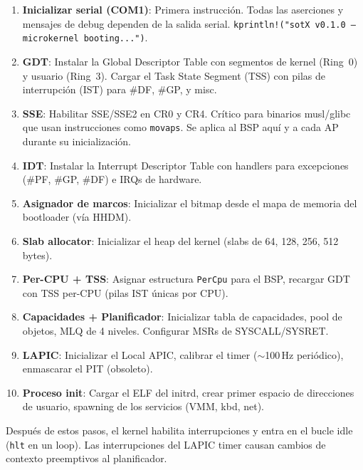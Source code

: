 \documentclass[11pt,twoside,openright]{book}
\theoremstyle{definition}
\theoremstyle{plain}
\theoremstyle{remark}
\begin{document}
\begin{enumerate}
    \item \textbf{Inicializar serial (COM1)}: Primera instrucción. Todas las
          aserciones y mensajes de debug dependen de la salida serial.
          \texttt{kprintln!("sotX v0.1.0 --- microkernel booting...")}.

    \item \textbf{GDT}: Instalar la Global Descriptor Table con segmentos
          de kernel (Ring~0) y usuario (Ring~3). Cargar el Task State Segment (TSS)
          con pilas de interrupción (IST) para \#DF, \#GP, y misc.

    \item \textbf{SSE}: Habilitar SSE/SSE2 en CR0 y CR4. Crítico para binarios
          musl/glibc que usan instrucciones como \texttt{movaps}. Se aplica al
          BSP aquí y a cada AP durante su inicialización.

    \item \textbf{IDT}: Instalar la Interrupt Descriptor Table con handlers para
          excepciones (\#PF, \#GP, \#DF) e IRQs de hardware.

    \item \textbf{Asignador de marcos}: Inicializar el bitmap desde el mapa de
          memoria del bootloader (vía HHDM).

    \item \textbf{Slab allocator}: Inicializar el heap del kernel (slabs de
          64, 128, 256, 512 bytes).

    \item \textbf{Per-CPU + TSS}: Asignar estructura \texttt{PerCpu} para el BSP,
          recargar GDT con TSS per-CPU (pilas IST únicas por CPU).

    \item \textbf{Capacidades + Planificador}: Inicializar tabla de capacidades,
          pool de objetos, MLQ de 4 niveles. Configurar MSRs de SYSCALL/SYSRET.

    \item \textbf{LAPIC}: Inicializar el Local APIC, calibrar el timer
          ($\sim$100\,Hz periódico), enmascarar el PIT (obsoleto).

    \item \textbf{Proceso init}: Cargar el ELF del initrd, crear primer espacio
          de direcciones de usuario, spawning de los servicios (VMM, kbd, net).
\end{enumerate}

Después de estos pasos, el kernel habilita interrupciones y entra en el bucle
idle (\texttt{hlt} en un loop). Las interrupciones del LAPIC timer causan cambios
de contexto preemptivos al planificador.
\end{document}
